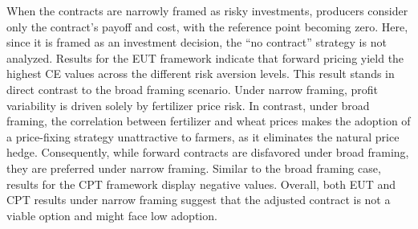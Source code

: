 \documentclass[12pt,a4paper]{article}
\begin{document}
When the contracts are narrowly framed as risky investments, producers consider only the contract's payoff and cost, with the reference point becoming zero. Here, since it is framed as an investment decision, the ``no contract'' strategy is not analyzed. Results for the EUT framework indicate that forward pricing yield the highest CE values across the different risk aversion levels. This result stands in direct contrast to the broad framing scenario. Under narrow framing, profit variability is driven solely by fertilizer price risk. In contrast, under broad framing, the correlation between fertilizer and wheat prices makes the adoption of a price-fixing strategy unattractive to farmers, as it eliminates the natural price hedge. Consequently, while forward contracts are disfavored under broad framing, they are preferred under narrow framing. Similar to the broad framing case, results for the CPT framework display negative values. Overall, both EUT and CPT results under narrow framing suggest that the adjusted contract is not a viable option and might face low adoption.

\begin{table}[H]
\centering
\caption{Certainty Equivalents (CE) for different level of absolute risk aversion $r$ under broad framing.}
\label{tab:EUT_broad}
\end{table}
\end{document}
